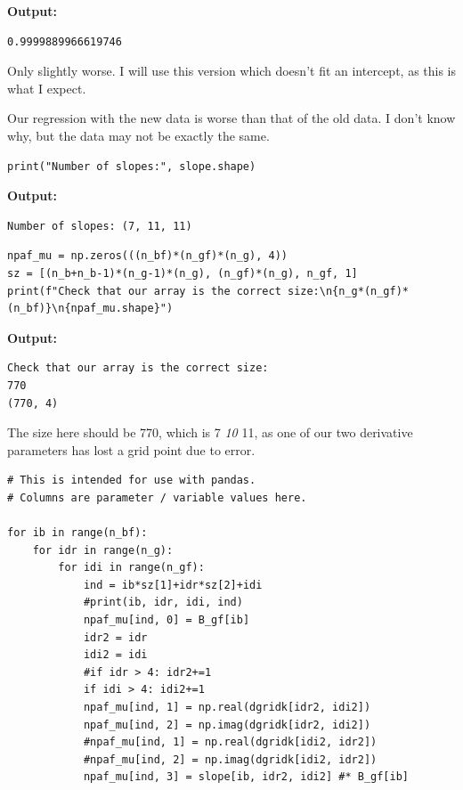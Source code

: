 \documentclass{article}
\begin{document}
\textbf{Output:}\begin{verbatim}
0.9999889966619746

\end{verbatim}

Only slightly worse. I will use this version which doesn't fit an intercept, as this is what I expect.

Our regression with the new data is worse than that of the old data. I don't know why, but the data may not be exactly the same. 

\begin{lstlisting}
print("Number of slopes:", slope.shape)\end{lstlisting}

\textbf{Output:}\begin{verbatim}
Number of slopes: (7, 11, 11)

\end{verbatim}

\begin{lstlisting}
npaf_mu = np.zeros(((n_bf)*(n_gf)*(n_g), 4))
sz = [(n_b+n_b-1)*(n_g-1)*(n_g), (n_gf)*(n_g), n_gf, 1]
print(f"Check that our array is the correct size:\n{n_g*(n_gf)*(n_bf)}\n{npaf_mu.shape}")\end{lstlisting}

\textbf{Output:}\begin{verbatim}
Check that our array is the correct size:
770
(770, 4)

\end{verbatim}

The size here should be 770, which is 7 \textit{ 10 } 11, as one of our two derivative parameters has lost a grid point due to error.

\begin{lstlisting}
# This is intended for use with pandas.
# Columns are parameter / variable values here.

for ib in range(n_bf):
    for idr in range(n_g):
        for idi in range(n_gf):
            ind = ib*sz[1]+idr*sz[2]+idi
            #print(ib, idr, idi, ind)
            npaf_mu[ind, 0] = B_gf[ib]
            idr2 = idr
            idi2 = idi
            #if idr > 4: idr2+=1
            if idi > 4: idi2+=1
            npaf_mu[ind, 1] = np.real(dgridk[idr2, idi2])
            npaf_mu[ind, 2] = np.imag(dgridk[idr2, idi2])
            #npaf_mu[ind, 1] = np.real(dgridk[idi2, idr2])
            #npaf_mu[ind, 2] = np.imag(dgridk[idi2, idr2])
            npaf_mu[ind, 3] = slope[ib, idr2, idi2] #* B_gf[ib]
\end{lstlisting}
\end{document}
